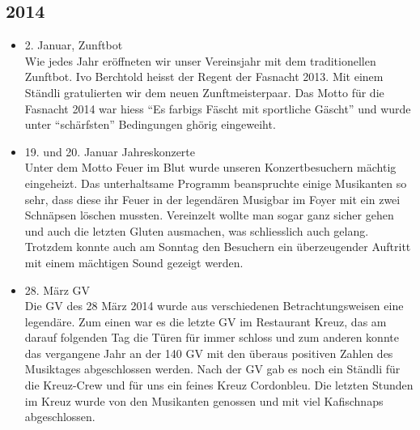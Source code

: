 \subsection*{2014}
\begin{history}


      \begin{itemize}

            \item 2. Januar, Zunftbot\\
                  Wie jedes Jahr eröffneten wir unser Vereinsjahr mit dem traditionellen
                  Zunftbot. Ivo Berchtold heisst der Regent der Fasnacht 2013. Mit einem
                  Ständli gratulierten wir dem neuen Zunftmeisterpaar. Das Motto für die
                  Fasnacht 2014 war hiess \enquote{Es farbigs Fäscht mit sportliche
                        Gäscht} und wurde unter \enquote{schärfsten} Bedingungen ghörig
                  eingeweiht.

            \item 19. und 20. Januar Jahreskonzerte\\
                  Unter dem Motto Feuer im Blut wurde unseren Konzertbesuchern mächtig
                  eingeheizt. Das unterhaltsame Programm beanspruchte einige Musikanten so
                  sehr, dass diese ihr Feuer in der legendären Musigbar im Foyer mit ein
                  zwei Schnäpsen löschen mussten. Vereinzelt wollte man sogar ganz sicher
                  gehen und auch die letzten Gluten ausmachen, was schliesslich auch
                  gelang. Trotzdem konnte auch am Sonntag den Besuchern ein überzeugender
                  Auftritt mit einem mächtigen Sound gezeigt werden.

            \item 28. März GV\\
                  Die GV des 28 März 2014 wurde aus verschiedenen Betrachtungsweisen eine
                  legendäre. Zum einen war es die letzte GV im Restaurant Kreuz, das am
                  darauf folgenden Tag die Türen für immer schloss und zum anderen konnte
                  das vergangene Jahr an der 140 GV mit den überaus positiven Zahlen des
                  Musiktages abgeschlossen werden. Nach der GV gab es noch ein Ständli für
                  die Kreuz-Crew und für uns ein feines Kreuz Cordonbleu.  Die letzten
                  Stunden im Kreuz wurde von den Musikanten  genossen und mit viel
                  Kafischnaps abgeschlossen.


\end{itemize}
\end{history}
